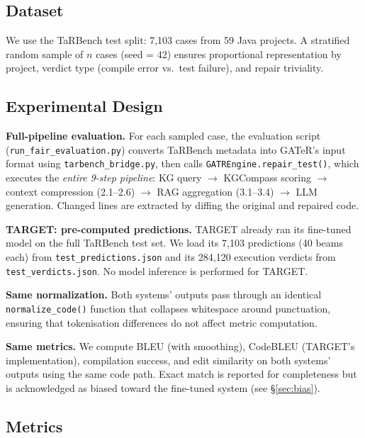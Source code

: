 \documentclass[conference,10pt]{IEEEtran}
\begin{document}
\subsection{Dataset}

We use the TaRBench test split: 7,103 cases from 59 Java projects.
A stratified random sample of $n$ cases (seed = 42) ensures proportional
representation by project, verdict type (compile error vs.\ test
failure), and repair triviality.

\subsection{Experimental Design}

\textbf{Full-pipeline evaluation.}
For each sampled case, the evaluation script
(\texttt{run\_fair\_evaluation.py}) converts TaRBench metadata into
GATeR's input format using \texttt{tarbench\_bridge.py}, then calls
\texttt{GATREngine.repair\_test()}, which executes the \emph{entire
9-step pipeline}: KG query $\to$ KGCompass scoring $\to$ context
compression (2.1--2.6) $\to$ RAG aggregation (3.1--3.4) $\to$ LLM
generation. Changed lines are extracted by diffing the original and
repaired code.

\textbf{TARGET: pre-computed predictions.}
TARGET already ran its fine-tuned model on the full TaRBench test set.
We load its 7,103 predictions (40 beams each) from
\texttt{test\_predictions.json} and its 284,120 execution verdicts from
\texttt{test\_verdicts.json}. No model inference is performed for TARGET.

\textbf{Same normalization.}
Both systems' outputs pass through an identical \texttt{normalize\_code()}
function that collapses whitespace around punctuation, ensuring that
tokenisation differences do not affect metric computation.

\textbf{Same metrics.}
We compute BLEU (with smoothing), CodeBLEU (TARGET's implementation),
compilation success, and edit similarity on both systems' outputs using
the same code path. Exact match is reported for completeness but is
acknowledged as biased toward the fine-tuned system (see
\S\ref{sec:bias}).

\subsection{Metrics}
\end{document}
